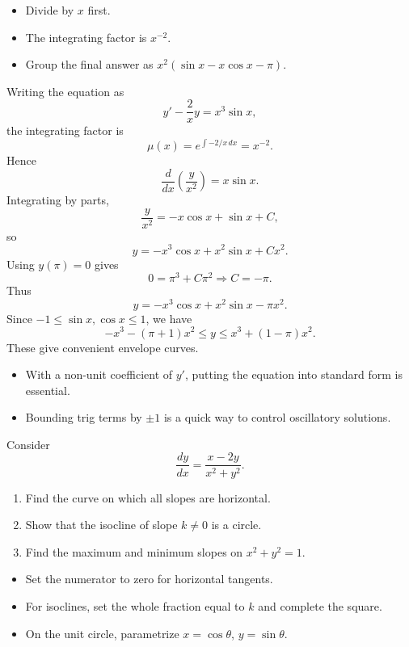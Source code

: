 \begin{hint}
\begin{itemize}[leftmargin=*]
    \item Divide by $x$ first.
    \item The integrating factor is $x^{-2}$.
    \item Group the final answer as $x^2(\sin x-x\cos x-\pi)$.
\end{itemize}
\end{hint}

\begin{solution}
Writing the equation as
\[
y'-\frac{2}{x}y=x^3\sin x,
\]
the integrating factor is
\[
\mu(x)=e^{\int -2/x\,dx}=x^{-2}.
\]
Hence
\[
\frac{d}{dx}\left(\frac{y}{x^2}\right)=x\sin x.
\]
Integrating by parts,
\[
\frac{y}{x^2}=-x\cos x+\sin x+C,
\]
so
\[
y=-x^3\cos x+x^2\sin x+Cx^2.
\]
Using $y(\pi)=0$ gives
\[
0=\pi^3+C\pi^2 \Rightarrow C=-\pi.
\]
Thus
\[
\boxed{y=-x^3\cos x+x^2\sin x-\pi x^2}.
\]
Since $-1\le \sin x,\cos x\le 1$, we have
\[
-x^3-(\pi+1)x^2\le y\le x^3+(1-\pi)x^2.
\]
These give convenient envelope curves.
\end{solution}

\begin{takeaways}
\begin{itemize}[leftmargin=*]
    \item With a non-unit coefficient of $y'$, putting the equation into standard form is essential.
    \item Bounding trig terms by $\pm1$ is a quick way to control oscillatory solutions.
\end{itemize}
\end{takeaways}

\begin{problem}
Consider
\[
\frac{dy}{dx}=\frac{x-2y}{x^2+y^2}.
\]
\begin{enumerate}
    \item[\textbf{i}] Find the curve on which all slopes are horizontal.
    \item[\textbf{ii}] Show that the isocline of slope $k\neq0$ is a circle.
    \item[\textbf{iii}] Find the maximum and minimum slopes on $x^2+y^2=1$.
\end{enumerate}
\end{problem}

\begin{hint}
\begin{itemize}[leftmargin=*]
    \item Set the numerator to zero for horizontal tangents.
    \item For isoclines, set the whole fraction equal to $k$ and complete the square.
    \item On the unit circle, parametrize $x=\cos\theta$, $y=\sin\theta$.
\end{itemize}
\end{hint}

